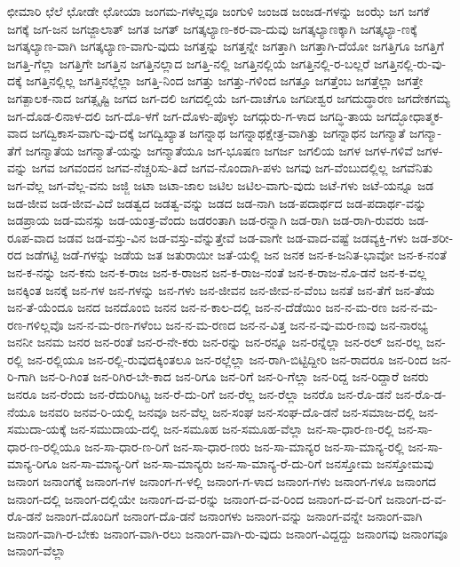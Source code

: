 ಛೀಮಾರಿ
ಛೆಲೆ
ಛೋಡೇ
ಛೋಯಾ
ಜಂಗಮ-ಗಳೆಲ್ಲವೂ
ಜಂಗುಳಿ
ಜಂಜಡ
ಜಂಜಡ-ಗಳನ್ನು
ಜಂಝೆ
ಜಗ
ಜಗಕೆ
ಜಗಕ್ಕೆ
ಜಗ-ಜನ
ಜಗಜ್ಜಾಲಾತ್
ಜಗತ
ಜಗತ್
ಜಗತ್ಕಲ್ಯಾಣ-ಕರ-ವಾ-ದುವು
ಜಗತ್ಕಲ್ಯಾಣಕ್ಕಾಗಿ
ಜಗತ್ಕಲ್ಯಾ-ಣಕ್ಕೆ
ಜಗತ್ಕಲ್ಯಾಣ-ವಾಗಿ
ಜಗತ್ಕಲ್ಯಾಣ-ವಾಗು-ವುದು
ಜಗತ್ತನ್ನು
ಜಗತ್ತನ್ನೇ
ಜಗತ್ತಾಗಿ
ಜಗತ್ತಾಗಿ-ದೆಯೋ
ಜಗತ್ತಿಗೂ
ಜಗತ್ತಿಗೆ
ಜಗತ್ತಿ-ಗೆಲ್ಲಾ
ಜಗತ್ತಿಗೇ
ಜಗತ್ತಿನ
ಜಗತ್ತಿನಲ್ಲಾದ
ಜಗತ್ತಿ-ನಲ್ಲಿ
ಜಗತ್ತಿನಲ್ಲಿಯೆ
ಜಗತ್ತಿನಲ್ಲಿ-ರ-ಬಲ್ಲರೆ
ಜಗತ್ತಿನಲ್ಲಿ-ರು-ವು-ದಕ್ಕೆ
ಜಗತ್ತಿನಲ್ಲಿಲ್ಲ
ಜಗತ್ತಿನಲ್ಲೆಲ್ಲಾ
ಜಗತ್ತಿ-ನಿಂದ
ಜಗತ್ತು
ಜಗತ್ತು-ಗಳಿಂದ
ಜಗತ್ತೂ
ಜಗತ್ತೆಂಬ
ಜಗತ್ತೆಲ್ಲಾ
ಜಗತ್ತೇ
ಜಗತ್ಪಾಲಕ-ನಾದ
ಜಗತ್ಸೃಷ್ಟಿ
ಜಗದ
ಜಗ-ದಲಿ
ಜಗದಲ್ಲಿಯೆ
ಜಗ-ದಾಚೆಗೂ
ಜಗದೀಶ್ವರ
ಜಗದುದ್ಧಾರಣ
ಜಗದೇಕಗಮ್ಯ
ಜಗ-ದೊಡ-ಲಿನಾಳ-ದಲಿ
ಜಗ-ದೊ-ಳಗೆ
ಜಗ-ದೊಳು-ಪೊಳ್ಳು
ಜಗದ್ಗುರು-ಗ-ಳಾದ
ಜಗದ್ಧಿ-ತಾಯ
ಜಗದ್ಭೋಧಾತ್ಮಕ-ವಾದ
ಜಗದ್ವಿಕಾಸ-ವಾಗು-ವು-ದಕ್ಕೆ
ಜಗದ್ವಿಖ್ಯಾತ
ಜಗನ್ನಾಥ
ಜಗನ್ನಾಥಕ್ಷೇತ್ರ-ವಾಗಿತ್ತು
ಜಗನ್ನಾಥನ
ಜಗನ್ಮಾತೆ
ಜಗನ್ಮಾ-ತೆಗೆ
ಜಗನ್ಮಾತೆಯ
ಜಗನ್ಮಾತೆ-ಯನ್ನು
ಜಗನ್ಮಾತೆಯೂ
ಜಗ-ಭೂಷಣ
ಜಗರ್ಜ
ಜಗಲಿಯ
ಜಗಳ
ಜಗಳ-ಗಳಿವೆ
ಜಗಳ-ವನ್ನು
ಜಗವ
ಜಗವಂದನ
ಜಗವ-ನೆಚ್ಚರಿಸು-ತಿದೆ
ಜಗವ-ನೊಂದಾಗಿ-ಪಳು
ಜಗವು
ಜಗ-ವೆಂಬುದಲ್ಲಿಲ್ಲ
ಜಗವೆನಿತು
ಜಗ-ವೆಲ್ಲ
ಜಗ-ವೆಲ್ಲ-ವನು
ಜಜ್ಜಿ
ಜಟಾ
ಜಟಾ-ಜಾಲ
ಜಟಿಲ
ಜಟಿಲ-ವಾಗು-ವುದು
ಜಟೆ-ಗಳು
ಜಟೆ-ಯನ್ನೂ
ಜಡ
ಜಡ-ಜೀವ
ಜಡ-ಜೀವ-ವಿದೆ
ಜಡತ್ವದ
ಜಡತ್ವ-ವನ್ನು
ಜಡದ
ಜಡ-ನಾಗಿ
ಜಡ-ಪದಾರ್ಥದ
ಜಡ-ಪದಾರ್ಥ-ವನ್ನು
ಜಡಪ್ರಾಯ
ಜಡ-ಮನಸ್ಸು
ಜಡ-ಯಂತ್ರ-ವೆಂದು
ಜಡರಂತಾಗಿ
ಜಡ-ರನ್ನಾಗಿ
ಜಡ-ರಾಗಿ
ಜಡ-ರಾಗಿ-ರುವರು
ಜಡ-ರೂಪ-ವಾದ
ಜಡವ
ಜಡ-ವಸ್ತು-ವಿನ
ಜಡ-ವಸ್ತು-ವೆನ್ನುತ್ತೇವೆ
ಜಡ-ವಾಗೇ
ಜಡ-ವಾದ-ವಷ್ಟೆ
ಜಡವ್ಯಕ್ತಿ-ಗಳು
ಜಡ-ಶರೀ-ರದ
ಜಡೆಗಟ್ಟಿ
ಜಡೆ-ಗಳನ್ನು
ಜಡೆಯ
ಜತ
ಜತುರಾಯೀ
ಜತೆ-ಯಲ್ಲಿ
ಜನ
ಜನಕ
ಜನ-ಕ-ಜನಿತ-ಭಾವೋ
ಜನ-ಕ-ನಂತೆ
ಜನ-ಕ-ನನ್ನು
ಜನ-ಕನು
ಜನ-ಕ-ರಾಜ
ಜನ-ಕ-ರಾಜನ
ಜನ-ಕ-ರಾಜ-ನಂತೆ
ಜನ-ಕ-ರಾಜ-ನೊ-ಡನೆ
ಜನ-ಕ-ವಲ್ಲ
ಜನಕ್ಕಿಂತ
ಜನಕ್ಕೆ
ಜನ-ಗಳ
ಜನ-ಗಳನ್ನು
ಜನ-ಗಳು
ಜನ-ಜೀವನ
ಜನ-ಜೀವ-ನ-ವೆಂಬ
ಜನತೆ
ಜನ-ತೆಗೆ
ಜನ-ತೆಯ
ಜನ-ತೆ-ಯೆಂದೂ
ಜನದ
ಜನದೊಂಬಿ
ಜನನ
ಜನ-ನ-ಕಾಲ-ದಲ್ಲಿ
ಜನ-ನ-ದೆಡೆಯಿಂ
ಜನ-ನ-ಮ-ರಣ
ಜನ-ನ-ಮ-ರಣ-ಗಳಿಲ್ಲವೊ
ಜನ-ನ-ಮ-ರಣ-ಗಳೆಂಬ
ಜನ-ನ-ಮ-ರಣದ
ಜನ-ನ-ವಿತ್ತ
ಜನ-ನ-ವು-ಮರ-ಣವು
ಜನ-ನಾರಭ್ಯ
ಜನನೀ
ಜನಮ
ಜನರ
ಜನ-ರಂತೆ
ಜನ-ರ-ನೇ-ಕರು
ಜನ-ರನ್ನು
ಜನ-ರನ್ನೂ
ಜನ-ರನ್ನೆಲ್ಲಾ
ಜನ-ರಲ್
ಜನ-ರಲ್ಲ
ಜನ-ರಲ್ಲಿ
ಜನ-ರಲ್ಲಿಯೂ
ಜನ-ರಲ್ಲಿ-ರುವುದಕ್ಕಿಂತಲೂ
ಜನ-ರಲ್ಲೆಲ್ಲಾ
ಜನ-ರಾಗಿ-ಬಿಟ್ಟಿದ್ದೀರಿ
ಜನ-ರಾದರೂ
ಜನ-ರಿಂದ
ಜನ-ರಿ-ಗಾಗಿ
ಜನ-ರಿ-ಗಿಂತ
ಜನ-ರಿಗಿರ-ಬೇ-ಕಾದ
ಜನ-ರಿಗೂ
ಜನ-ರಿಗೆ
ಜನ-ರಿ-ಗೆಲ್ಲಾ
ಜನ-ರಿದ್ದ
ಜನ-ರಿದ್ದಾರೆ
ಜನರು
ಜನರೂ
ಜನ-ರೆಂದು
ಜನ-ರೆದುರಿಗಿಟ್ಟ
ಜನ-ರೆ-ದು-ರಿಗೆ
ಜನ-ರೆಲ್ಲ
ಜನ-ರೆಲ್ಲಾ
ಜನರೊ
ಜನ-ರೊ-ಡನೆ
ಜನ-ರೊ-ಡ-ನೆಯೂ
ಜನವರಿ
ಜನವ-ರಿ-ಯಲ್ಲಿ
ಜನವೂ
ಜನ-ವೆಲ್ಲ
ಜನ-ಸಂಘ
ಜನ-ಸಂಘ-ದೊ-ಡನೆ
ಜನ-ಸಮಾಜ-ದಲ್ಲಿ
ಜನ-ಸಮುದಾ-ಯಕ್ಕೆ
ಜನ-ಸಮುದಾಯ-ದಲ್ಲಿ
ಜನ-ಸಮೂಹ
ಜನ-ಸಮೂಹ-ವೆಲ್ಲಾ
ಜನ-ಸಾ-ಧಾರ-ಣ-ರಲ್ಲಿ
ಜನ-ಸಾ-ಧಾರ-ಣ-ರಲ್ಲಿಯೂ
ಜನ-ಸಾ-ಧಾರ-ಣ-ರಿಗೆ
ಜನ-ಸಾ-ಧಾರ-ಣರು
ಜನ-ಸಾ-ಮಾನ್ಯರ
ಜನ-ಸಾ-ಮಾನ್ಯ-ರಲ್ಲಿ
ಜನ-ಸಾ-ಮಾನ್ಯ-ರಿಗೂ
ಜನ-ಸಾ-ಮಾನ್ಯ-ರಿಗೆ
ಜನ-ಸಾ-ಮಾನ್ಯರು
ಜನ-ಸಾ-ಮಾನ್ಯ-ರೆ-ದು-ರಿಗೆ
ಜನಸ್ತೋಮ
ಜನಸ್ತೋಮವು
ಜನಾಂಗ
ಜನಾಂಗಕ್ಕೆ
ಜನಾಂಗ-ಗಳ
ಜನಾಂಗ-ಗ-ಳಲ್ಲಿ
ಜನಾಂಗ-ಗ-ಳಾದ
ಜನಾಂಗ-ಗಳು
ಜನಾಂಗ-ಗಳೂ
ಜನಾಂಗದ
ಜನಾಂಗ-ದಲ್ಲಿ
ಜನಾಂಗ-ದಲ್ಲಿಯೇ
ಜನಾಂಗ-ದ-ವ-ರನ್ನು
ಜನಾಂಗ-ದ-ವ-ರಿಂದ
ಜನಾಂಗ-ದ-ವ-ರಿಗೆ
ಜನಾಂಗ-ದ-ವ-ರೊ-ಡನೆ
ಜನಾಂಗ-ದೊಂದಿಗೆ
ಜನಾಂಗ-ದೊ-ಡನೆ
ಜನಾಂಗಳು
ಜನಾಂಗ-ವನ್ನು
ಜನಾಂಗ-ವನ್ನೇ
ಜನಾಂಗ-ವಾಗಿ
ಜನಾಂಗ-ವಾಗಿ-ರ-ಬೇಕು
ಜನಾಂಗ-ವಾಗಿ-ರಲು
ಜನಾಂಗ-ವಾಗಿ-ರು-ವುದು
ಜನಾಂಗ-ವಿದ್ದದ್ದು
ಜನಾಂಗವು
ಜನಾಂಗವೂ
ಜನಾಂಗ-ವೆಲ್ಲಾ
